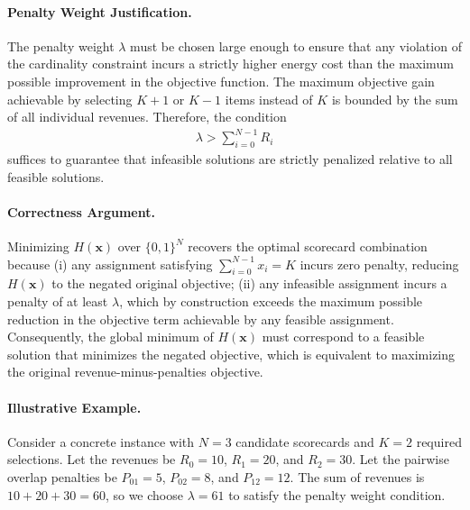 \documentclass[12pt]{article}
\begin{document}
\paragraph{Penalty Weight Justification.}
The penalty weight $\lambda$ must be chosen large enough to ensure that any violation of the cardinality constraint incurs a strictly higher energy cost than the maximum possible improvement in the objective function. The maximum objective gain achievable by selecting $K+1$ or $K-1$ items instead of $K$ is bounded by the sum of all individual revenues. Therefore, the condition
\begin{align}
    \lambda > \sum_{i=0}^{N-1} R_i
\end{align}
suffices to guarantee that infeasible solutions are strictly penalized relative to all feasible solutions.

\paragraph{Correctness Argument.}
Minimizing $H(\mathbf{x})$ over $\{0, 1\}^N$ recovers the optimal scorecard combination because (i) any assignment satisfying $\sum_{i=0}^{N-1} x_i = K$ incurs zero penalty, reducing $H(\mathbf{x})$ to the negated original objective; (ii) any infeasible assignment incurs a penalty of at least $\lambda$, which by construction exceeds the maximum possible reduction in the objective term achievable by any feasible assignment. Consequently, the global minimum of $H(\mathbf{x})$ must correspond to a feasible solution that minimizes the negated objective, which is equivalent to maximizing the original revenue-minus-penalties objective.

\paragraph{Illustrative Example.}
Consider a concrete instance with $N = 3$ candidate scorecards and $K = 2$ required selections. Let the revenues be $R_0 = 10$, $R_1 = 20$, and $R_2 = 30$. Let the pairwise overlap penalties be $P_{01} = 5$, $P_{02} = 8$, and $P_{12} = 12$. The sum of revenues is $10 + 20 + 30 = 60$, so we choose $\lambda = 61$ to satisfy the penalty weight condition.
\end{document}
